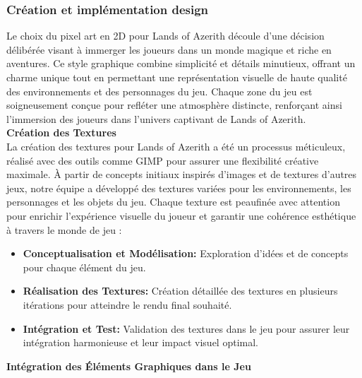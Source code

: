 \subsubsection{Création et implémentation design}

Le choix du pixel art en 2D pour Lands of Azerith découle d'une décision délibérée visant à immerger les joueurs dans un monde magique et riche en aventures.
Ce style graphique combine simplicité et détails minutieux, offrant un charme unique tout en permettant une représentation visuelle de haute qualité des environnements et des personnages du jeu.
Chaque zone du jeu est soigneusement conçue pour refléter une atmosphère distincte, renforçant ainsi l'immersion des joueurs dans l'univers captivant de Lands of Azerith.
\\

\textbf{Création des Textures}
\\

La création des textures pour Lands of Azerith a été un processus méticuleux, réalisé avec des outils comme GIMP pour assurer une flexibilité créative maximale.
À partir de concepts initiaux inspirés d'images et de textures d'autres jeux, notre équipe a développé des textures variées pour les environnements, les personnages et les objets du jeu.
Chaque texture est peaufinée avec attention pour enrichir l'expérience visuelle du joueur et garantir une cohérence esthétique à travers le monde de jeu :
\\

\begin{itemize}

      \item \textbf{Conceptualisation et Modélisation:} Exploration d'idées et de concepts pour chaque élément du jeu.
            \\

      \item \textbf{Réalisation des Textures:} Création détaillée des textures en plusieurs itérations pour atteindre le rendu final souhaité.
            \\

      \item \textbf{Intégration et Test:} Validation des textures dans le jeu pour assurer leur intégration harmonieuse et leur impact visuel optimal.
            \\

\end{itemize}

\textbf{Intégration des Éléments Graphiques dans le Jeu}
\\

